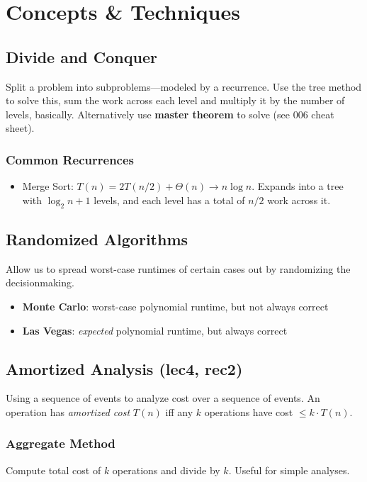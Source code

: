 \documentclass{article}
\begin{document}
\section{Concepts \& Techniques}
\begin{multicols}{2}
\subsection{Divide and Conquer}
Split a problem into subproblems---modeled by a recurrence. Use the tree method to solve this, sum the work across each level and multiply it by the number of levels, basically. Alternatively use \textbf{master theorem} to solve (see 006 cheat sheet).

\subsubsection{Common Recurrences}
\begin{itemize}
	\item Merge Sort: $T(n) = 2T(n/2) + \Theta(n) \rightarrow n\log n$. Expands into a tree with $\log_2 n + 1$ levels, and each level has a total of $n/2$ work across it.
\end{itemize}

\subsection{Randomized Algorithms}
Allow us to spread worst-case runtimes of certain cases out by randomizing the decisionmaking.
\begin{itemize}[noitemsep, topsep=0pt]
	\item \textbf{Monte Carlo}: worst-case polynomial runtime, but not always correct
	\item \textbf{Las Vegas}: \textit{expected} polynomial runtime, but always correct

\end{itemize}

\subsection{Amortized Analysis (lec4, rec2)}
Using a sequence of events to analyze cost over a sequence of events. An operation has \textit{amortized cost} $T(n)$ iff any $k$ operations have cost $\leq k\cdot T(n)$.

\subsubsection{Aggregate Method}
Compute total cost of $k$ operations and divide by $k$. Useful for simple analyses.


\end{multicols}
\end{document}
